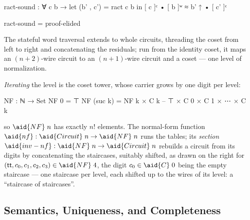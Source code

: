 \begin{code}
ract-sound : ∀ c b → let (b' , c') = ract c b in [ c ]ᶜ • [ b ]ʷ ≈ b' ↑ • [ c' ]ᶜ
\end{code}
\begin{code}[hide]
ract-sound = proof-elided
\end{code}

The stateful word traversal  extends
 to whole circuits, threading the coset from left to right and
concatenating the residuals; run from the identity coset, it maps an
$(n{+}2)$-wire circuit to an $(n{+}1)$-wire circuit and a coset --- one
level of normalization.

\emph{Iterating} the level is the coset tower, whose carrier grows by
one digit per level:

\begin{center}
\begin{minipage}[c]{0.56\linewidth}
\begingroup\setlength{\mathindent}{0pt}
\begin{code}
NF : ℕ → Set
NF 0       = ⊤
NF (suc k) = NF k × C k   -- ⊤ × C 0 × C 1 × ⋯ × C k
\end{code}
\endgroup
\end{minipage}\hspace{2.5em}%
\begin{minipage}[c]{0.16\linewidth}\centering
\end{minipage}
\end{center}

\noindent so $\aid{NF}\;n$ has exactly $n!$ elements.  The normal-form
function $\aid{nf} : \aid{Circuit}\;n \to \aid{NF}\;n$ runs the tables;
its \emph{section} $\aid{inv-nf} : \aid{NF}\;n \to \aid{Circuit}\;n$
rebuilds a circuit from its digits by concatenating the staircases,
suitably shifted, as drawn on the right for $(\mathsf{tt}, c_0, c_1,
c_2, c_3) \in \aid{NF}\;4$, the digit $c_0 \in \aid{C}\;0$ being the
empty staircase --- one staircase per level, each shifted up to the
wires of its level: a ``staircase of staircases''.

\subsection{Semantics, Uniqueness, and Completeness}\label{app:sn-semantics}

